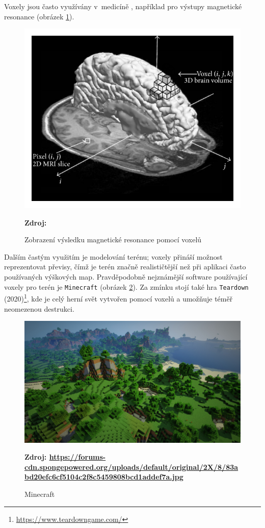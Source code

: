 Voxely jsou často využívány v~medicíně \cite{medical_vox}, například pro výstupy magnetické resonance (obrázek \ref{fig:mri_vox}).

\begin{figure}[H]
	\centering
	\includegraphics[scale=1]{obrazky-figures/voxel_mri.png}
	\caption{Zobrazení výsledku magnetické resonance pomocí voxelů}
	\textbf{Zdroj: \cite{mri}}
	\label{fig:mri_vox}
\end{figure}

Dalším častým využitím je modelování terénu; voxely přináší možnost reprezentovat převisy, čímž je terén značně realističtější než při aplikaci často používaných výškových map. Pravděpodobně nejznámější software používající voxely pro terén je \texttt{Minecraft} (obrázek \ref{fig:minecraft}). Za zmínku stojí také hra \texttt{Teardown} (2020)\footnote{\url{https://www.teardowngame.com/}}, kde je celý herní svět vytvořen pomocí voxelů a umožňuje téměř neomezenou destrukci.

\begin{figure}[H]
	\centering
	\includegraphics[scale=0.13]{obrazky-figures/minecraft.jpg}
	\caption{Minecraft}
	\textbf{Zdroj: \url{https://forums-cdn.spongepowered.org/uploads/default/original/2X/8/83abd20efc6cf5104c2f8c5459808bcd1addef7a.jpg}}
	\label{fig:minecraft}
\end{figure}

